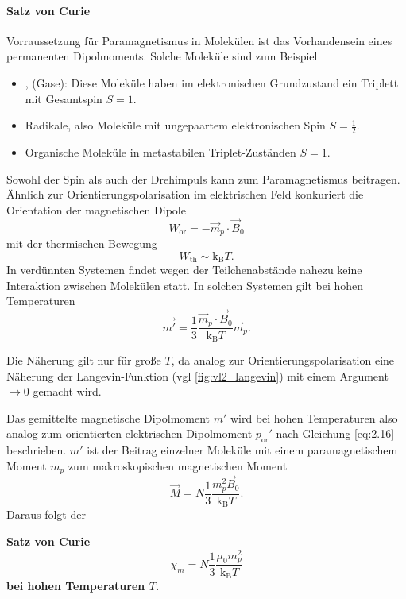 	\paragraph{Satz von Curie}
	Vorraussetzung für Paramagnetismus in Molekülen ist das Vorhandensein eines permanenten Dipolmoments. Solche Moleküle sind zum Beispiel
	\begin{itemize}
		\item {},  (Gase): Diese Moleküle haben im elektronischen Grundzustand ein Triplett mit Gesamtspin $S=1$.
		\item Radikale, also Moleküle mit ungepaartem elektronischen Spin $S=\frac{1}{2}$.
		\item Organische Moleküle in metastabilen Triplet-Zuständen $S = 1$.
	\end{itemize}
	Sowohl der Spin als auch der Drehimpuls kann zum Paramagnetismus beitragen.\\

	Ähnlich zur Orientierungspolarisation im elektrischen Feld konkuriert die Orientation der magnetischen Dipole 
	$$
	W_{\text{or}} = - \vec{m}_{p}\cdot\vec{B}_{0}
	$$ 
	mit der thermischen Bewegung 
	$$
	W_{\text{th}} \sim \mathrm{k}_{\mathrm{B}} T.
	$$
	In verdünnten Systemen findet wegen der Teilchenabstände nahezu keine Interaktion zwischen Molekülen statt. In solchen Systemen gilt {bei hohen Temperaturen}
	\begin{equation}
		\label{eq:2.36}
		\vec{m'} = \frac{1}{3} \frac{\vec{m}_{p}\cdot\vec{B}_{0}}{\mathrm{k}_{\mathrm{B}} T} \vec{m}_{p}.
	\end{equation}
	\begin{verbal}
		Die Näherung gilt nur für große $T$, da analog zur Orientierungspolarisation eine Näherung der Langevin-Funktion (vgl \autoref{fig:vl2_langevin}) mit einem Argument $\to 0$ gemacht wird.
	\end{verbal}
	Das gemittelte magnetische Dipolmoment $m'$ wird bei hohen Temperaturen also analog zum orientierten elektrischen Dipolmoment $p_\text{or}'$ nach Gleichung \eqref{eq:2.16} beschrieben.
	$m'$ ist der Beitrag einzelner Moleküle mit einem paramagnetischem Moment $m_{p}$ zum makroskopischen magnetischen Moment 
	\begin{equation}
		\label{eq:2.37}
		\vec{M} = N \frac{1}{3} \frac{m_{p}^2 \vec{B}_{0}}{\mathrm{k}_{\mathrm{B}}T}.
	\end{equation}
	Daraus folgt der
	\begin{important}
		\textbf{Satz von Curie}\\
		\begin{equation}
			\label{eq:2.38}
			\chi_{m} = N \frac{1}{3} \frac{ \mu_0 m_{p}^2}{\mathrm{k}_{\mathrm{B}} T}
		\end{equation}
		\textbf{bei hohen Temperaturen $T$.}
	\end{important}

